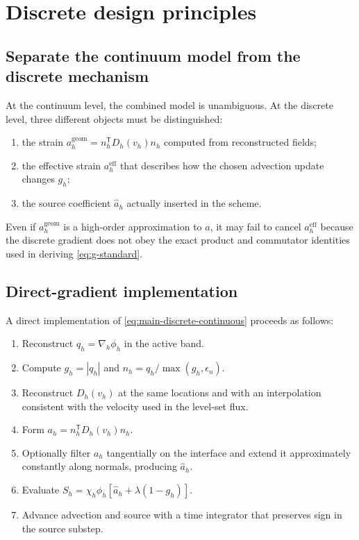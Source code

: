 \documentclass[11pt,a4paper]{article}
\theoremstyle{definition}
\theoremstyle{remark}
\newcommand{\abs}[1]{\left\lvert #1\right\rvert}
\begin{document}
\section{Discrete design principles}

\subsection{Separate the continuum model from the discrete mechanism}

At the continuum level, the combined model is unambiguous. At the discrete level, three different objects must be distinguished:
\begin{enumerate}
  \item the strain $a_h^{\mathrm{geom}}=n_h^{\mathsf T}D_h(v_h)n_h$ computed from reconstructed fields;
  \item the effective strain $a_h^{\mathrm{eff}}$ that describes how the chosen advection update changes $g_h$;
  \item the source coefficient $\widehat a_h$ actually inserted in the scheme.
\end{enumerate}
Even if $a_h^{\mathrm{geom}}$ is a high-order approximation to $a$, it may fail to cancel $a_h^{\mathrm{eff}}$ because the discrete gradient does not obey the exact product and commutator identities used in deriving \eqref{eq:g-standard}.

\subsection{Direct-gradient implementation}

A direct implementation of \eqref{eq:main-discrete-continuous} proceeds as follows:
\begin{enumerate}
  \item Reconstruct $q_h=\nabla_h\phi_h$ in the active band.
  \item Compute $g_h=\abs{q_h}$ and $n_h=q_h/\max(g_h,\epsilon_n)$.
  \item Reconstruct $D_h(v_h)$ at the same locations and with an interpolation consistent with the velocity used in the level-set flux.
  \item Form $a_h=n_h^{\mathsf T}D_h(v_h)n_h$.
  \item Optionally filter $a_h$ tangentially on the interface and extend it approximately constantly along normals, producing $\widehat a_h$.
  \item Evaluate $S_h=\chi_h\phi_h[\widehat a_h+\lambda(1-g_h)]$.
  \item Advance advection and source with a time integrator that preserves sign in the source substep.
\end{enumerate}
\end{document}
